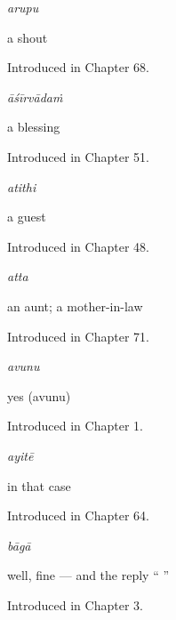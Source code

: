\noindent\begin{minipage}[t]{\linewidth}
\raggedright
\textbf{}\enspace\emph{arupu}\par
\small a shout\par
\footnotesize Introduced in Chapter 68.
\end{minipage}\par\medskip

\noindent\begin{minipage}[t]{\linewidth}
\raggedright
\textbf{}\enspace\emph{āśīrvādaṁ}\par
\small a blessing\par
\footnotesize Introduced in Chapter 51.
\end{minipage}\par\medskip

\noindent\begin{minipage}[t]{\linewidth}
\raggedright
\textbf{}\enspace\emph{atithi}\par
\small a guest\par
\footnotesize Introduced in Chapter 48.
\end{minipage}\par\medskip

\noindent\begin{minipage}[t]{\linewidth}
\raggedright
\textbf{}\enspace\emph{atta}\par
\small an aunt; a mother-in-law\par
\footnotesize Introduced in Chapter 71.
\end{minipage}\par\medskip

\noindent\begin{minipage}[t]{\linewidth}
\raggedright
\textbf{}\enspace\emph{avunu}\par
\small yes (avunu)\par
\footnotesize Introduced in Chapter 1.
\end{minipage}\par\medskip

\noindent\begin{minipage}[t]{\linewidth}
\raggedright
\textbf{}\enspace\emph{ayitē}\par
\small in that case\par
\footnotesize Introduced in Chapter 64.
\end{minipage}\par\medskip

\noindent\begin{minipage}[t]{\linewidth}
\raggedright
\textbf{}\enspace\emph{bāgā}\par
\small well, fine — and the reply \textquotedblleft{} \textquotedblright{}\par
\footnotesize Introduced in Chapter 3.
\end{minipage}\par\medskip

